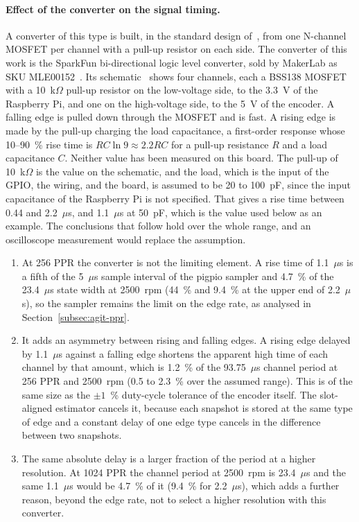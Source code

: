 \paragraph{Effect of the converter on the signal timing.}
A converter of this type is built, in the standard design of~\citet{nxp2007an10441}, from one N-channel MOSFET per channel with a pull-up resistor on each side. The converter of this work is the SparkFun bi-directional logic level converter, sold by MakerLab as SKU MLE00152~\citep{makerlabllc}. Its schematic~\citep{sparkfunlls} shows four channels, each a BSS138 MOSFET with a 10~k$\Omega$ pull-up resistor on the low-voltage side, to the 3.3~V of the Raspberry Pi, and one on the high-voltage side, to the 5~V of the encoder. A falling edge is pulled down through the MOSFET and is fast. A rising edge is made by the pull-up charging the load capacitance, a first-order response whose 10--90~\% rise time is $RC\ln 9 \approx 2.2RC$ for a pull-up resistance $R$ and a load capacitance $C$. Neither value has been measured on this board. The pull-up of 10~k$\Omega$ is the value on the schematic, and the load, which is the input of the GPIO, the wiring, and the board, is assumed to be 20 to 100~pF, since the input capacitance of the Raspberry Pi is not specified. That gives a rise time between 0.44 and 2.2~$\mu$s, and 1.1~$\mu$s at 50~pF, which is the value used below as an example. The conclusions that follow hold over the whole range, and an oscilloscope measurement would replace the assumption.
\begin{enumerate}
    \item At 256 PPR the converter is not the limiting element. A rise time of 1.1~$\mu$s is a fifth of the 5~$\mu$s sample interval of the pigpio sampler and 4.7~\% of the 23.4~$\mu$s state width at 2500~rpm (44~\% and 9.4~\% at the upper end of 2.2~$\mu$s), so the sampler remains the limit on the edge rate, as analysed in Section~\ref{subsec:agit-ppr}.
    \item It adds an asymmetry between rising and falling edges. A rising edge delayed by 1.1~$\mu$s against a falling edge shortens the apparent high time of each channel by that amount, which is 1.2~\% of the 93.75~$\mu$s channel period at 256 PPR and 2500~rpm (0.5 to 2.3~\% over the assumed range). This is of the same size as the $\pm 1$~\% duty-cycle tolerance of the encoder itself. The slot-aligned estimator cancels it, because each snapshot is stored at the same type of edge and a constant delay of one edge type cancels in the difference between two snapshots.
    \item The same absolute delay is a larger fraction of the period at a higher resolution. At 1024 PPR the channel period at 2500~rpm is 23.4~$\mu$s and the same 1.1~$\mu$s would be 4.7~\% of it (9.4~\% for 2.2~$\mu$s), which adds a further reason, beyond the edge rate, not to select a higher resolution with this converter.
\end{enumerate}

